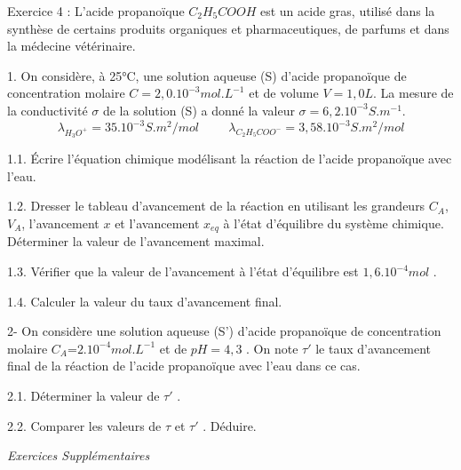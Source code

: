 \documentclass[12pt, french]{article}
\begin{document}
\begin{Box2}{Exercice 4 : }
L'acide propanoïque $C_2H_5COOH$ est un acide gras, utilisé dans la synthèse de certains produits organiques et
pharmaceutiques, de parfums et dans la médecine vétérinaire.

1. On considère, à 25°C, une solution aqueuse (S) d’acide propanoïque de concentration molaire $C =2,0.10^{-3}mol.L^{-1}$ et de volume $V =1,0 L$. La mesure de la conductivité $\sigma$ de la solution (S) a donné la valeur $\sigma = 6,2.10^{-3} S.m^{-1}$.
$$\lambda_{H_3O^+} = 35.10^{-3}S.m^2/mol \hspace{1cm} \lambda_{C_2H_5COO^-}=3,58.10^{-3}S.m^2/mol$$

1.1. Écrire l’équation chimique modélisant la réaction de l’acide propanoïque avec l’eau.

1.2. Dresser le tableau d’avancement de la réaction en utilisant les grandeurs $C_A$, $V_A$, l'avancement $x$ et l'avancement $x_{eq}$ à l'état d’équilibre du système chimique. Déterminer la valeur de l'avancement maximal.

1.3. Vérifier que la valeur de l'avancement à l'état d’équilibre est $1, 6.10^{-4} mol$ .

1.4. Calculer la valeur du taux d'avancement final.

2- On considère une solution aqueuse (S') d'acide propanoïque de concentration molaire $C_A$=$2.10^{-4} mol.L^{-1}$ et de
$pH = 4, 3$ . On note $\tau'$ le taux d'avancement final de la réaction de l'acide propanoïque avec l'eau dans ce cas.

2.1. Déterminer la valeur de $\tau'$ .

2.2. Comparer les valeurs de $\tau$ et $\tau'$ . Déduire.


\end{Box2}
\vspace{-0.8cm}
\begin{center}
   \Large{ \em{Exercices Supplémentaires}}
\end{center}
\end{document}
